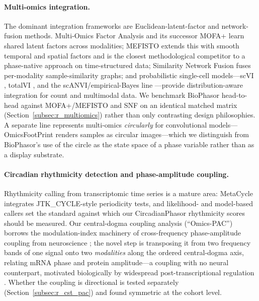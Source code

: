\documentclass[preprint,12pt,amsmath,amssymb,superscriptaddress,floatfix]{revtex4-2}
\begin{document}
\paragraph{Multi-omics integration.}
The dominant integration frameworks are Euclidean-latent-factor and
network-fusion methods. Multi-Omics Factor Analysis \citep{argelaguet2018} and
its successor MOFA+ \citep{argelaguet2020} learn shared latent factors across
modalities; MEFISTO \citep{velten2022} extends this with smooth temporal and
spatial factors and is the closest methodological competitor to a phase-native
approach on time-structured data; Similarity Network Fusion \citep{wang2014}
fuses per-modality sample-similarity graphs; and probabilistic single-cell
models---scVI \citep{lopez2018}, totalVI \citep{gayoso2021}, and the
scANVI/empirical-Bayes line \citep{xu2021,boyeau2023}---provide
distribution-aware integration for count and multimodal data. We benchmark
BioPhasor head-to-head against MOFA+/MEFISTO and SNF on an identical matched
matrix (Section~\ref{subsec:r_multiomics}) rather than only contrasting design
philosophies. A separate line represents multi-omics \emph{circularly} for
convolutional models---OmicsFootPrint \citep{njoku2024} renders samples as
circular images---which we distinguish from BioPhasor's use of the circle as
the state space of a phase variable rather than as a display substrate.

\paragraph{Circadian rhythmicity detection and phase-amplitude coupling.}
Rhythmicity calling from transcriptomic time series is a mature area: MetaCycle
\citep{wu2016} integrates JTK\_CYCLE-style periodicity tests, and likelihood- and
model-based callers \citep{braun2018,ding2021,rubioponce2021} set the standard
against which our CircadianPhasor rhythmicity scores should be measured. Our
central-dogma coupling analysis (``Omics-PAC'') borrows the modulation-index
machinery of cross-frequency phase-amplitude coupling from neuroscience
\citep{scherer2022}; the novel step is transposing it from two frequency bands
of one signal onto two \emph{modalities} along the ordered central-dogma axis,
relating mRNA phase and protein amplitude---a coupling with no neural
counterpart, motivated biologically by widespread post-transcriptional
regulation \citep{srivastava2022}. Whether the coupling is directional is tested
separately (Section~\ref{subsec:r_cst_pac}) and found symmetric at the cohort
level.
\end{document}

